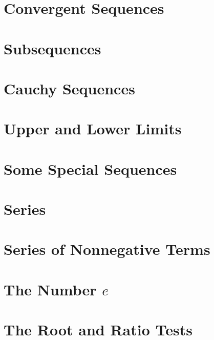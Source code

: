 
\section{Convergent Sequences}\label{sec:convergent-sequences}


\section{Subsequences}\label{sec:subsequences}


\section{Cauchy Sequences}\label{sec:cauchy-sequences}


\section{Upper and Lower Limits}\label{sec:upper-and-lower-limits}


\section{Some Special Sequences}\label{sec:some-special-sequences}


\section{Series}\label{sec:series}


\section{Series of Nonnegative Terms}\label{sec:series-of-nonnegative-terms}


\section{The Number $e$}\label{sec:the-number-$e$}


\section{The Root and Ratio Tests}\label{sec:the-root-and-ratio-tests}


